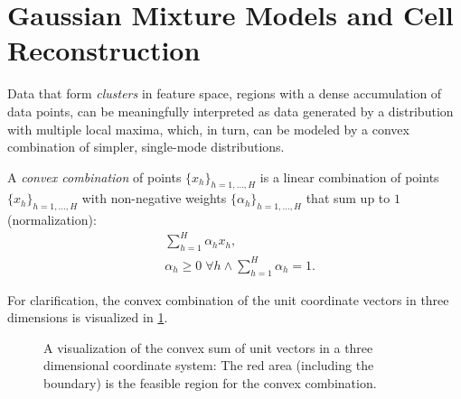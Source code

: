 \section{Gaussian Mixture Models and Cell Reconstruction}
\label{sec:gmm-gmm}
Data that form \emph{clusters} in feature space, \ie regions with a dense accumulation of
data points, can be meaningfully interpreted as data generated by a distribution with multiple
local maxima, which, in turn, can be modeled by a convex combination of simpler, single-mode distributions.

\begin{mydef}
    \label{def:convex-combination}
    A \emph{convex combination} of points $\{x_h\}_{h=1,\hdots,H}$ is a linear combination of points
    $\{x_h\}_{h=1,\hdots,H}$ with non-negative weights $\{\alpha_h\}_{h=1,\hdots,H}$ that sum up to $1$ (normalization):
    \begin{align}
        \label{eq:def-convex-combination}
        &\sum_{h=1}^H \alpha_h x_h, \\
        &\alpha_h \ge 0 \; \forall h \wedge \sum_{h=1}^H \alpha_h = 1.
    \end{align}
\end{mydef}
For clarification, the convex combination of the unit coordinate vectors in three dimensions is visualized in
\cref{fig:gmm-convex-combination}.
\begin{figure}
    \centering
    
    \caption[Convex sum visualization]{A visualization of the convex sum of unit vectors in a three dimensional coordinate
        system: The red area (including the boundary) is the feasible region for the convex combination.}
    \label{fig:gmm-convex-combination}
\end{figure}

